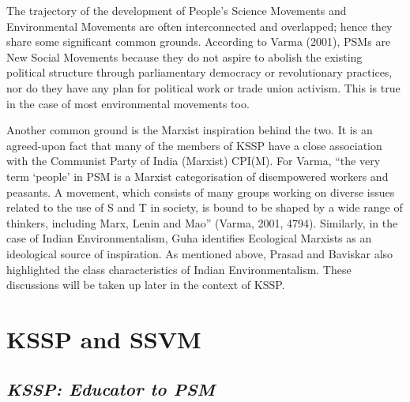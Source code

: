 \documentclass[twoside, 13pt]{article}
\begin{document}
{\fontsize{12}{14}\selectfont The trajectory of the development of People’s Science Movements and Environmental Movements are often interconnected and overlapped; hence they share some significant common grounds. According to Varma (2001), PSMs are New Social Movements because they do not aspire to abolish the existing political structure through parliamentary democracy or revolutionary practices, nor do they have any plan for political work or trade union activism. This is true in the case of most environmental movements too.


Another common ground is the Marxist inspiration behind the two. It is an agreed-upon fact that many of the members of KSSP have a close association with the Communist Party of India (Marxist) CPI(M). For Varma, “the very term ‘people’ in PSM is a Marxist categorisation of disempowered workers and peasants. A movement, which consists of many groups working on diverse issues related to the use of S and T in society, is bound to be shaped by a wide range of thinkers, including Marx, Lenin and Mao” (Varma, 2001, 4794). Similarly, in the case of Indian Environmentalism, Guha identifies Ecological Marxists as an ideological source of inspiration. As mentioned above, Prasad and Baviskar also highlighted the class characteristics of Indian Environmentalism. These discussions will be taken up later in the context of KSSP. 


{\fontsize{18}{20}\selectfont\section*{KSSP and SSVM}}

\vspace{-.4cm}

{\fontsize{8}{10}\selectfont\subsection*{\textit{KSSP: Educator to PSM}}}

\vspace{-.1cm}

}
\end{document}
